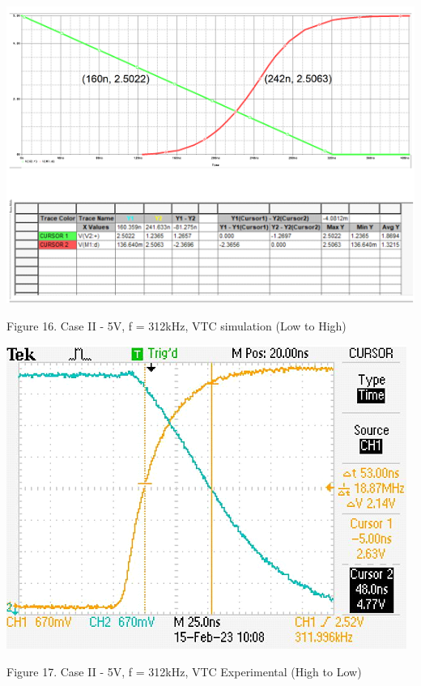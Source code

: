 \documentclass[conference]{IEEEtran}
\begin{document}
\begin{center}
    \centerline{\includegraphics[scale = 0.6]{figures/case2_results_LH.png}}
    Figure 16. Case II - 5V, f = 312kHz, VTC simulation (Low to High)
\end{center}

\begin{center}
    \centerline{\includegraphics[scale = 0.6]{figures/case2_HL_experimental.png}}
    Figure 17. Case II - 5V, f = 312kHz, VTC Experimental (High to Low)
\end{center}
\end{document}
